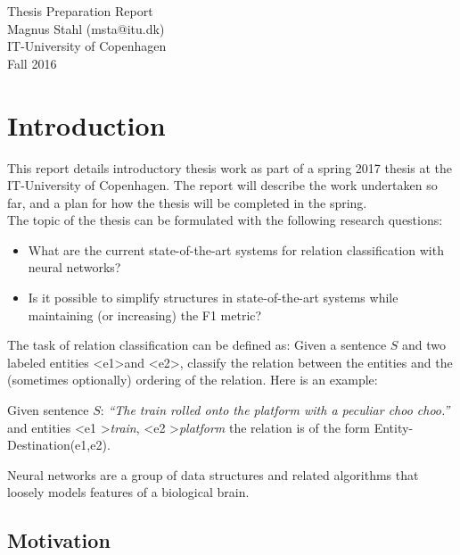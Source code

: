 \documentclass{article}
\begin{document}
\begin{center}
    \vspace{2cm}
    \huge { Thesis Preparation Report \\ }
    \vspace{2cm}
    \large {Magnus Stahl (msta@itu.dk)\\
    IT-University of Copenhagen\\
    Fall 2016}
\end{center}


\tableofcontents


\section{Introduction}
 
This report details introductory thesis work as part of a spring 2017 thesis at the IT-University of Copenhagen. The report will describe the work undertaken so far, and a plan for how the thesis will be completed in the spring. \\

The topic of the thesis can be formulated with the following research questions:
\begin{itemize}
    \item What are the current state-of-the-art systems for relation classification 
    with neural networks?\\
    \item Is it possible to simplify structures in state-of-the-art systems while maintaining (or increasing) the F1 metric?
\end{itemize}


The task of relation classification can be defined as:
Given a sentence $S$ and two labeled entities \textless e1\textgreater  and \textless e2\textgreater , classify the relation between the entities and the (sometimes optionally) ordering of the relation. Here is an example:

Given sentence $S$: \emph{``The train rolled onto the platform with a peculiar choo choo.''}
and entities \textless e1 \textgreater \emph{train}, \textless e2 \textgreater \emph{platform} the relation is of the form Entity-Destination(e1,e2).

Neural networks are a group of data structures and related algorithms that loosely models features of a biological brain.  


\subsection{Motivation}
\end{document}
